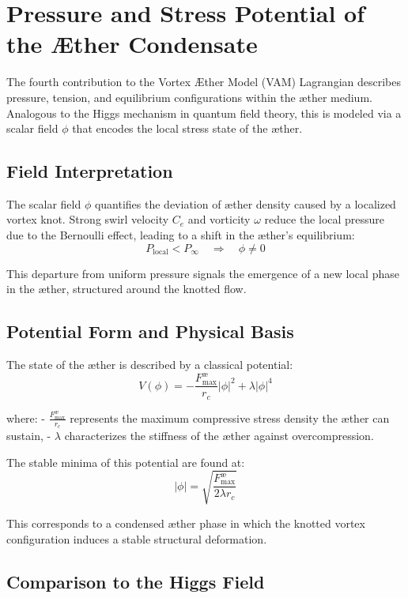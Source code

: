 \section{Pressure and Stress Potential of the Æther Condensate}

The fourth contribution to the Vortex Æther Model (VAM) Lagrangian describes pressure, tension, and equilibrium configurations within the æther medium. Analogous to the Higgs mechanism in quantum field theory, this is modeled via a scalar field $\phi$ that encodes the local stress state of the æther.

\subsection*{Field Interpretation}

The scalar field $\phi$ quantifies the deviation of æther density caused by a localized vortex knot. Strong swirl velocity $C_e$ and vorticity $\omega$ reduce the local pressure due to the Bernoulli effect, leading to a shift in the æther’s equilibrium:
\[
    P_\text{local} < P_\infty \quad \Rightarrow \quad \phi \neq 0
\]

This departure from uniform pressure signals the emergence of a new local phase in the æther, structured around the knotted flow.

\subsection*{Potential Form and Physical Basis}

The state of the æther is described by a classical potential:
\[
    V(\phi) = -\frac{F^{\text{\ae}}_{\text{max}}}{r_c} |\phi|^2 + \lambda |\phi|^4
\]

where:
- $\frac{F^{\text{\ae}}_{\text{max}}}{r_c}$ represents the maximum compressive stress density the æther can sustain,
- $\lambda$ characterizes the stiffness of the æther against overcompression.

The stable minima of this potential are found at:
\[
    |\phi| = \sqrt{\frac{F^{\text{\ae}}_{\text{max}}}{2\lambda r_c}}
\]

This corresponds to a condensed æther phase in which the knotted vortex configuration induces a stable structural deformation.

\subsection*{Comparison to the Higgs Field}

